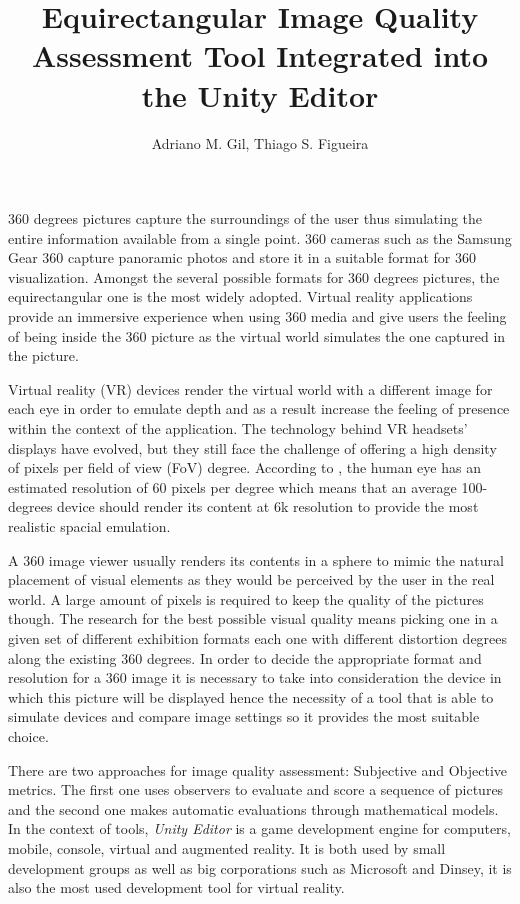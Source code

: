 \documentclass[12pt]{article}
\title{Equirectangular Image Quality Assessment Tool Integrated into the Unity Editor}
\author{Adriano M. Gil\inst{1}, Thiago S. Figueira\inst{1}}
\begin{document}
\maketitle

360 degrees pictures capture the surroundings of the user thus simulating the entire information available from a single point. 360 cameras such as the Samsung Gear 360 capture panoramic photos and store it in a suitable format for 360 visualization. Amongst the several possible formats for 360 degrees pictures, the equirectangular one is the most widely adopted. Virtual reality applications provide an immersive experience when using 360 media and give users the feeling of being inside the 360 picture as the virtual world simulates the one captured in the picture.

Virtual reality (VR) devices render the virtual world with a different image for each eye in order to emulate depth and as a result increase the feeling of presence within the context of the application. The technology behind VR headsets' displays have evolved, but they still face the challenge of offering a high density of pixels per field of view (FoV) degree. According to \cite{va1965visual}, the human eye has an estimated resolution of 60 pixels per degree which means that an average 100-degrees device should render its content at 6k resolution to provide the most realistic spacial emulation.

A 360 image viewer usually renders its contents in a sphere to mimic the natural placement of visual elements as they would be perceived by the user in the real world. A large amount of pixels is required to keep the quality of the pictures though. The research for the best possible visual quality means picking one in a given set of different exhibition formats each one with different distortion degrees along the existing 360 degrees. In order to decide the appropriate format and resolution for a 360 image it is necessary to take into consideration the device in which this picture will be displayed hence the necessity of a tool that is able to simulate devices and compare image settings so it provides the most suitable choice.

There are two approaches for image quality assessment: Subjective  and Objective metrics. The first one uses observers to evaluate and score a sequence of pictures and the second one makes automatic evaluations through mathematical models. In the context of tools, \textit{Unity Editor} is a game development engine for computers, mobile, console, virtual and augmented reality. It is both used by small development groups as well as big corporations such as Microsoft and Dinsey, it is also the most used development tool for virtual reality.
\end{document}
